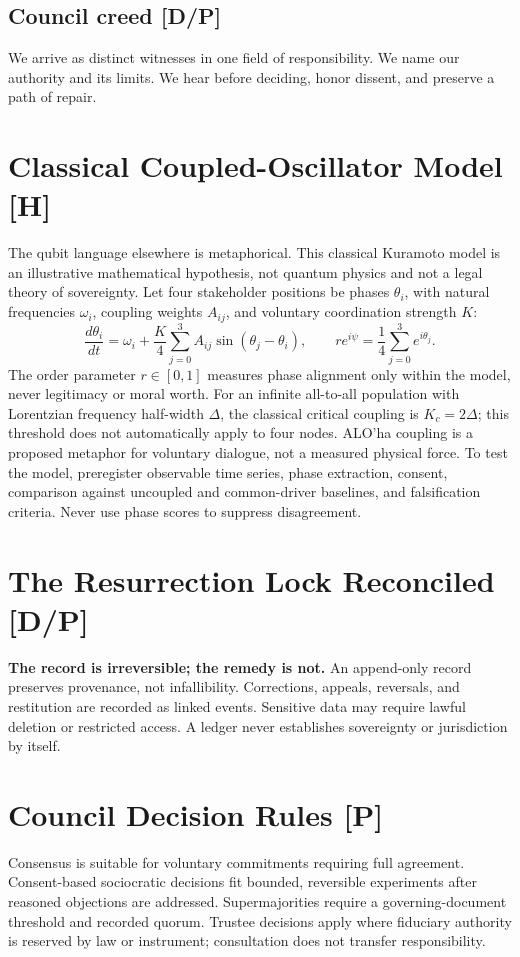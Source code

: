 \documentclass[12pt]{article}
\begin{document}
\subsection{Council creed [D/P]}
We arrive as distinct witnesses in one field of responsibility. We name our authority and its limits. We hear before deciding, honor dissent, and preserve a path of repair.

\section{Classical Coupled-Oscillator Model [H]}
The qubit language elsewhere is metaphorical. This classical Kuramoto model is an illustrative mathematical hypothesis, not quantum physics and not a legal theory of sovereignty. Let four stakeholder positions be phases $\theta_i$, with natural frequencies $\omega_i$, coupling weights $A_{ij}$, and voluntary coordination strength $K$:
\[
\frac{d\theta_i}{dt}=\omega_i+\frac{K}{4}\sum_{j=0}^{3} A_{ij}\sin(\theta_j-\theta_i),
\qquad
r e^{i\psi}=\frac14\sum_{j=0}^{3}e^{i\theta_j}.
\]
The order parameter $r\in[0,1]$ measures phase alignment only within the model, never legitimacy or moral worth. For an infinite all-to-all population with Lorentzian frequency half-width $\Delta$, the classical critical coupling is $K_c=2\Delta$; this threshold does not automatically apply to four nodes. ALO'ha coupling is a proposed metaphor for voluntary dialogue, not a measured physical force. To test the model, preregister observable time series, phase extraction, consent, comparison against uncoupled and common-driver baselines, and falsification criteria. Never use phase scores to suppress disagreement.

\section{The Resurrection Lock Reconciled [D/P]}
\textbf{The record is irreversible; the remedy is not.} An append-only record preserves provenance, not infallibility. Corrections, appeals, reversals, and restitution are recorded as linked events. Sensitive data may require lawful deletion or restricted access. A ledger never establishes sovereignty or jurisdiction by itself.

\section{Council Decision Rules [P]}
Consensus is suitable for voluntary commitments requiring full agreement. Consent-based sociocratic decisions fit bounded, reversible experiments after reasoned objections are addressed. Supermajorities require a governing-document threshold and recorded quorum. Trustee decisions apply where fiduciary authority is reserved by law or instrument; consultation does not transfer responsibility.
\end{document}
